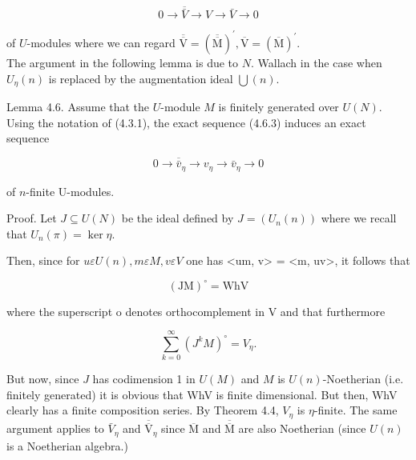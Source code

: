 \documentclass[10pt]{article}
\begin{document}
\begin{equation*}
0 \rightarrow \overline{\bar{V}} \rightarrow V \rightarrow \bar{V} \rightarrow 0 \tag{4.6.3}
\end{equation*}


of $U$-modules where we can regard $\overline{\overline{\mathrm{V}}}=(\overline{\overline{\mathrm{M}}})^{\prime}, \overline{\mathrm{V}}=(\overline{\mathrm{M}})^{\prime}$.\\
The argument in the following lemma is due to $N$. Wallach in the case when $U_{\eta}(n)$ is replaced by the augmentation ideal $\bigcup(n)$.

Lemma 4.6. Assume that the $U$-module $M$ is finitely generated over $U(N)$. Using the notation of (4.3.1), the exact sequence (4.6.3) induces an exact sequence


\begin{equation*}
0 \rightarrow \overline{\bar{v}}_{\eta} \rightarrow v_{\eta} \rightarrow \bar{v}_{\eta} \rightarrow 0 \tag{4.6.4}
\end{equation*}


of $n$-finite U-modules.

Proof. Let $J \subseteq U(N)$ be the ideal defined by $J=\left(U_{n}(n)\right)$ where we recall that $U_{n}(\pi)=\operatorname{ker} \eta$.

Then, since for $u \varepsilon U(n), m \varepsilon M, v \varepsilon V$ one has <um, v> = <m, uv>, it follows that


\begin{equation*}
(\mathrm{JM})^{\circ}=\mathrm{WhV} \tag{4.6.5}
\end{equation*}


where the superscript o denotes orthocomplement in V and that furthermore


\begin{equation*}
\sum_{k=0}^{\infty}\left(J^{k} M\right)^{\circ}=V_{\eta} . \tag{4.6.6}
\end{equation*}


But now, since $J$ has codimension 1 in $U(M)$ and $M$ is $U(n)$-Noetherian (i.e. finitely generated) it is obvious that WhV is finite dimensional. But then, WhV clearly has a finite composition series. By Theorem 4.4, $V_{\eta}$ is $\eta$-finite. The same argument applies to $\bar{V}_{\eta}$ and $\overline{\overline{\mathrm{V}}}_{\eta}$ since $\overline{\mathrm{M}}$ and $\overline{\overline{\mathrm{M}}}$ are also Noetherian (since $U(n)$ is a Noetherian algebra.)
\end{document}
